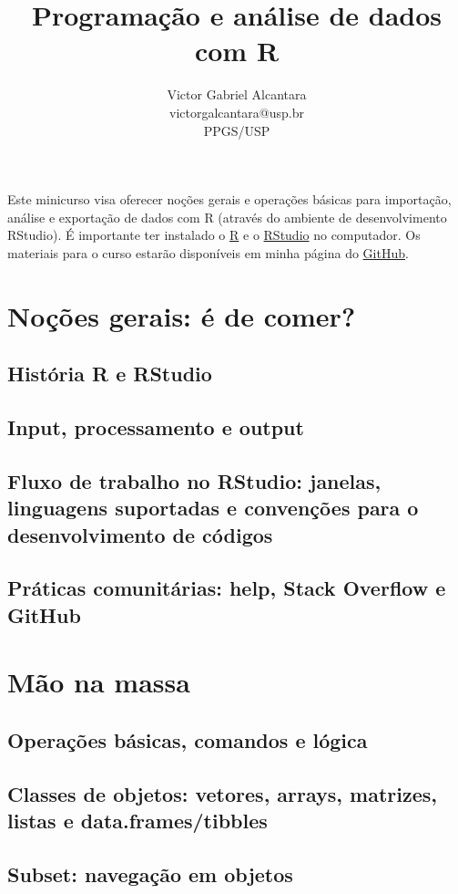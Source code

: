 \documentclass{article}
\title{Programação e análise de dados com R}
\author{Victor Gabriel Alcantara \\ victorgalcantara@usp.br \\ PPGS/USP}
\date{}
\begin{document}
\maketitle
Este minicurso visa oferecer noções gerais e operações básicas para importação, análise e exportação de dados com R (através do ambiente de desenvolvimento RStudio). É importante ter instalado o \href{https://brieger.esalq.usp.br/CRAN/}{R} e o \href{https://www.rstudio.com/products/rstudio/download}{RStudio} no computador. Os materiais para o curso estarão disponíveis em minha página do \href{https://github.com/victorgalcantara?tab=repositories}{GitHub}.

\section{Noções gerais: é de comer?}
\subsection{História R e RStudio}
\subsection{Input, processamento e output}
\subsection{Fluxo de trabalho no RStudio: janelas, linguagens suportadas e convenções para o desenvolvimento de códigos}
\subsection{Práticas comunitárias: help, Stack Overflow e GitHub}

\section{Mão na massa}
\subsection{Operações básicas, comandos e lógica}
\subsection{Classes de objetos: vetores, arrays, matrizes, listas e data.frames/tibbles}
\subsection{Subset: navegação em objetos}
\end{document}
